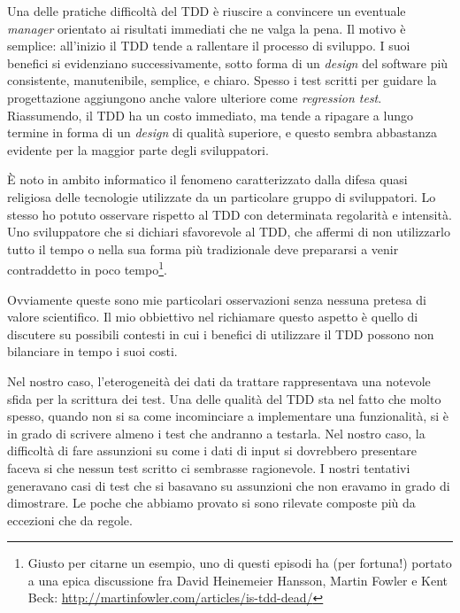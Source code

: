 \documentclass[12pt]{report}
\begin{document}
Una delle pratiche difficoltà del TDD è riuscire a convincere un eventuale
\textit{manager} orientato ai risultati immediati che ne valga la pena. 
Il motivo è semplice: all'inizio il TDD tende a rallentare 
il processo di sviluppo. 
I suoi benefici si evidenziano successivamente, 
sotto forma di un \textit{design} del software più consistente,
manutenibile, semplice, e chiaro. Spesso i test scritti per guidare 
la progettazione aggiungono anche valore ulteriore 
come \textit{regression test}. Riassumendo, 
il TDD ha un costo immediato, ma tende a ripagare a lungo
termine in forma di un \textit{design} di qualità superiore, e questo
sembra abbastanza evidente per la maggior parte degli sviluppatori.

È noto in ambito informatico il fenomeno caratterizzato
dalla difesa quasi religiosa delle tecnologie utilizzate da un
particolare gruppo di sviluppatori. Lo stesso ho potuto
osservare rispetto al TDD con determinata regolarità e intensità.
Uno sviluppatore che si dichiari
sfavorevole al TDD, che affermi di non utilizzarlo tutto il tempo o 
nella sua forma più tradizionale deve prepararsi a venir 
contraddetto in poco tempo\footnote{
	Giusto per citarne un esempio,
	uno di questi episodi ha (per fortuna!)
	portato a una epica discussione fra David Heinemeier Hansson,
	Martin Fowler e Kent Beck: 
	\url{http://martinfowler.com/articles/is-tdd-dead/}
}.
	
Ovviamente queste sono mie particolari osservazioni senza nessuna
pretesa di valore scientifico. Il mio obbiettivo nel
richiamare questo aspetto è quello di discutere su possibili
contesti in cui i benefici di utilizzare il TDD possono non bilanciare
in tempo  i suoi costi. 

Nel nostro caso, l'eterogeneità dei dati da trattare rappresentava 
una notevole sfida per la scrittura dei test. Una delle qualità 
del TDD sta nel fatto che molto spesso, quando non si sa 
come incominciare a implementare una funzionalità, si è in
grado di scrivere almeno i test che andranno a testarla. Nel nostro
caso, la difficoltà di fare assunzioni su come i dati di input 
si dovrebbero presentare faceva si che nessun test scritto 
ci sembrasse ragionevole. I nostri tentativi generavano casi di 
test che si basavano su assunzioni che non eravamo in grado di 
dimostrare. Le poche che abbiamo provato si sono rilevate composte 
più da eccezioni che da regole.
\end{document}
